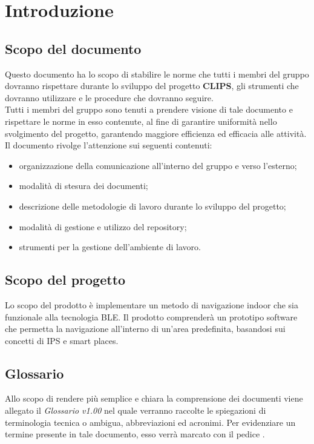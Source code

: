 \documentclass[../NormeProgetto.tex]{subfiles}
\begin{document}
\section{Introduzione}
	\subsection{Scopo del documento}
	Questo documento ha lo scopo di stabilire le norme che tutti i membri del gruppo \leaf dovranno rispettare durante lo sviluppo del progetto \textbf{CLIPS}, gli strumenti che dovranno utilizzare e le procedure che dovranno seguire. \\
	Tutti i membri del gruppo sono tenuti a prendere visione di tale documento e rispettare le norme in esso contenute, al fine di garantire uniformità nello svolgimento del progetto, garantendo maggiore efficienza ed efficacia alle attività. \\
	Il documento rivolge l'attenzione sui seguenti contenuti:
	\begin{itemize}
	\item organizzazione della comunicazione all'interno del gruppo e verso l'esterno;
	\item modalità di stesura dei documenti;
	\item descrizione delle metodologie di lavoro durante lo sviluppo del progetto;
	\item modalità di gestione e utilizzo del repository\g;
	\item strumenti per la gestione dell'ambiente di lavoro.
	\end{itemize}

	\subsection{Scopo del progetto}
	Lo scopo del prodotto è implementare un metodo di navigazione indoor che sia funzionale alla tecnologia BLE.
	Il prodotto comprenderà un prototipo software che permetta la navigazione all’interno di un’area predefinita, basandosi sui concetti di IPS e smart places.
	
	\subsection{Glossario} 
	Allo scopo di rendere più semplice e chiara la comprensione dei documenti viene allegato il \textit{Glossario v1.00} nel quale verranno raccolte le spiegazioni di  terminologia tecnica o  ambigua,
abbreviazioni ed acronimi. Per evidenziare un termine presente in tale documento, esso verrà marcato con il pedice \g.
	
\end{document}
